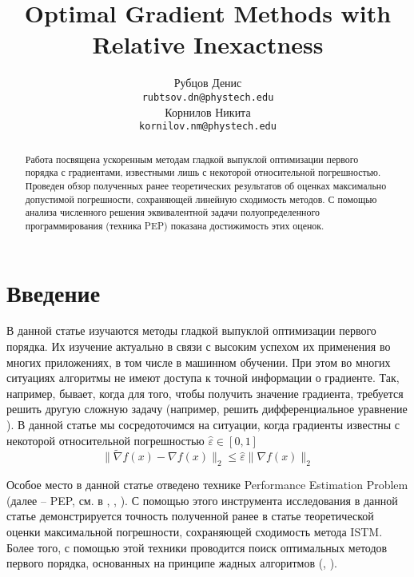 \documentclass{article}
\title{Optimal Gradient Methods with Relative Inexactness}
\author{
	Рубцов Денис \\
	\texttt{rubtsov.dn@phystech.edu} \\
	\And
	Корнилов Никита \\
	\texttt{kornilov.nm@phystech.edu} \\
}
\date{}
\begin{document}
\maketitle

\begin{abstract}
Работа посвящена ускоренным методам гладкой выпуклой оптимизации первого порядка с градиентами, известными лишь с некоторой относительной погрешностью. Проведен обзор полученных ранее теоретических результатов об оценках максимально допустимой погрешности, сохраняющей линейную сходимость методов. С помощью анализа численного решения эквивалентной задачи полуопределенного программирования (техника PEP) показана достижимость этих оценок.

\end{abstract}



\section{\textbf{Введение}}

В данной статье изучаются методы гладкой выпуклой оптимизации первого порядка. Их изучение актуально в связи с высоким успехом их применения во многих приложениях, в том числе в машинном обучении. При этом во многих ситуациях алгоритмы не имеют доступа к точной информации о градиенте. Так, например, бывает, когда для того, чтобы получить значение градиента, требуется решить другую сложную задачу (например, решить дифференциальное уравнение \cite{matyukhin2021convex}). В данной статье мы сосредоточимся на ситуации, когда градиенты известны с некоторой относительной погрешностью $\hat{\varepsilon} \in [0, 1]$ $$\|\widetilde{\nabla} f(x) - \nabla f(x)\|_2 \leq \hat{\varepsilon} \|\nabla f(x)\|_2$$

Особое место в данной статье отведено технике Performance Estimation Problem (далее -- PEP, см. в \cite{goujaud2022pepit}, \cite{taylor2017smooth}, \cite{taylor2017convex}). С помощью этого инструмента исследования в данной статье демонстрируется точность полученной ранее в статье \cite{kornilov2023intermediate} теоретической оценки максимальной погрешности, сохраняющей сходимость метода ISTM. Более того, с помощью этой техники проводится поиск оптимальных методов первого порядка, основанных на принципе жадных алгоритмов (\cite{goujaud2023fundamental}, \cite{kim2018generalizing}). 
\end{document}

